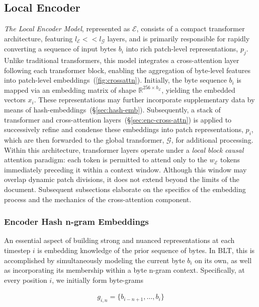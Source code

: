 \subsection{Local Encoder}
\label{section:local}

\textit{The Local Encoder Model}, represented as $\mathcal{E}$, consists of a compact transformer architecture, featuring $l_{\mathcal{E}} << l_{\mathcal{G}}$ layers, and is primarily responsible for rapidly converting a sequence of input bytes $b_i$ into rich patch-level representations, $p_j$. Unlike traditional transformers, this model integrates a cross-attention layer following each transformer block, enabling the aggregation of byte-level features into patch-level embeddings~(\autoref{fig:crossattn}).
Initially, the byte sequence $b_i$ is mapped via an embedding matrix of shape $\mathbb{R}^{256 \times h_{\mathcal{E}}}$, yielding the embedded vectors $x_i$. These representations may further incorporate supplementary data by means of hash-embeddings~(\S\ref{sec:hash-emb}).
Subsequently, a stack of transformer and cross-attention layers~(\S\ref{sec:enc-cross-attn}) is applied to successively refine and condense these embeddings into patch representations, $p_i$, which are then forwarded to the global transformer, $\mathcal{G}$, for additional processing.
Within this architecture, transformer layers operate under a \textit{local block causal} attention paradigm: each token is permitted to attend only to the $w_{\mathcal{E}}$ tokens immediately preceding it within a context window. Although this window may overlap dynamic patch divisions, it does not extend beyond the limits of the document. Subsequent subsections elaborate on the specifics of the embedding process and the mechanics of the cross-attention component.

\subsubsection{Encoder Hash n-gram Embeddings}
\label{sec:ngram-emb}
\label{sec:hash-emb}
An essential aspect of building strong and nuanced representations at each timestep $i$ is embedding knowledge of the prior sequence of bytes. In {\textsc BLT}, this is accomplished by simultaneously modeling the current byte $b_i$ on its own, as well as incorporating its membership within a byte n-gram context. Specifically, at every position $i$, we initially form byte-grams

\begin{align}
    g_{i,n}=\{b_{i-n + 1},\ldots, b_i\}
\end{align}

